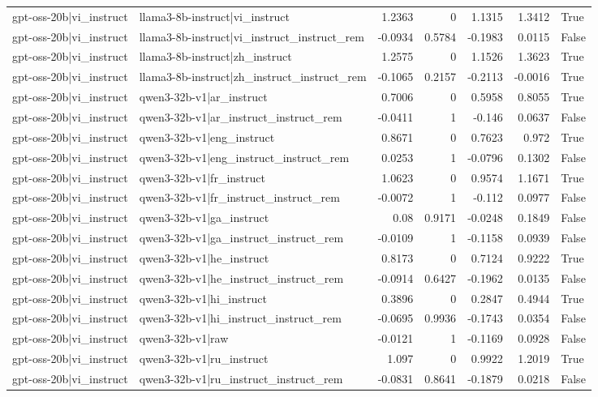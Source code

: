 \begin{table}
\begin{tabular}{l l r r r r l}
gpt-oss-20b|vi_instruct & llama3-8b-instruct|vi_instruct & 1.2363 & 0 & 1.1315 & 1.3412 & True \\
gpt-oss-20b|vi_instruct & llama3-8b-instruct|vi_instruct_instruct_rem & -0.0934 & 0.5784 & -0.1983 & 0.0115 & False \\
gpt-oss-20b|vi_instruct & llama3-8b-instruct|zh_instruct & 1.2575 & 0 & 1.1526 & 1.3623 & True \\
gpt-oss-20b|vi_instruct & llama3-8b-instruct|zh_instruct_instruct_rem & -0.1065 & 0.2157 & -0.2113 & -0.0016 & True \\
gpt-oss-20b|vi_instruct & qwen3-32b-v1|ar_instruct & 0.7006 & 0 & 0.5958 & 0.8055 & True \\
gpt-oss-20b|vi_instruct & qwen3-32b-v1|ar_instruct_instruct_rem & -0.0411 & 1 & -0.146 & 0.0637 & False \\
gpt-oss-20b|vi_instruct & qwen3-32b-v1|eng_instruct & 0.8671 & 0 & 0.7623 & 0.972 & True \\
gpt-oss-20b|vi_instruct & qwen3-32b-v1|eng_instruct_instruct_rem & 0.0253 & 1 & -0.0796 & 0.1302 & False \\
gpt-oss-20b|vi_instruct & qwen3-32b-v1|fr_instruct & 1.0623 & 0 & 0.9574 & 1.1671 & True \\
gpt-oss-20b|vi_instruct & qwen3-32b-v1|fr_instruct_instruct_rem & -0.0072 & 1 & -0.112 & 0.0977 & False \\
gpt-oss-20b|vi_instruct & qwen3-32b-v1|ga_instruct & 0.08 & 0.9171 & -0.0248 & 0.1849 & False \\
gpt-oss-20b|vi_instruct & qwen3-32b-v1|ga_instruct_instruct_rem & -0.0109 & 1 & -0.1158 & 0.0939 & False \\
gpt-oss-20b|vi_instruct & qwen3-32b-v1|he_instruct & 0.8173 & 0 & 0.7124 & 0.9222 & True \\
gpt-oss-20b|vi_instruct & qwen3-32b-v1|he_instruct_instruct_rem & -0.0914 & 0.6427 & -0.1962 & 0.0135 & False \\
gpt-oss-20b|vi_instruct & qwen3-32b-v1|hi_instruct & 0.3896 & 0 & 0.2847 & 0.4944 & True \\
gpt-oss-20b|vi_instruct & qwen3-32b-v1|hi_instruct_instruct_rem & -0.0695 & 0.9936 & -0.1743 & 0.0354 & False \\
gpt-oss-20b|vi_instruct & qwen3-32b-v1|raw & -0.0121 & 1 & -0.1169 & 0.0928 & False \\
gpt-oss-20b|vi_instruct & qwen3-32b-v1|ru_instruct & 1.097 & 0 & 0.9922 & 1.2019 & True \\
gpt-oss-20b|vi_instruct & qwen3-32b-v1|ru_instruct_instruct_rem & -0.0831 & 0.8641 & -0.1879 & 0.0218 & False \\

\end{tabular}
\end{table}
